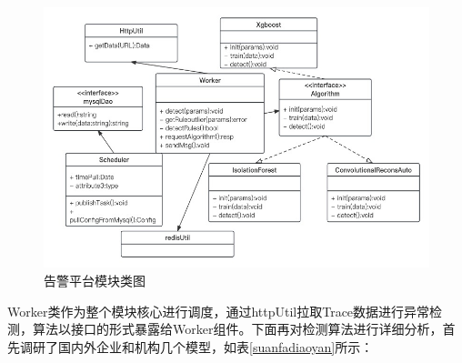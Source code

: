 \begin{figure}[htbp]
  \centering
  \includegraphics[scale=0.3888]{figure/chapter4/告警平台模块类图.jpg}
  \caption{告警平台模块类图}\label{gaojingclass}
\end{figure}
Worker类作为整个模块核心进行调度，通过httpUtil拉取Trace数据进行异常检测，算法以接口的形式暴露给Worker组件。下面再对检测算法进行详细分析，首先调研了国内外企业和机构几个模型，如表\ref{suanfadiaoyan}所示：
